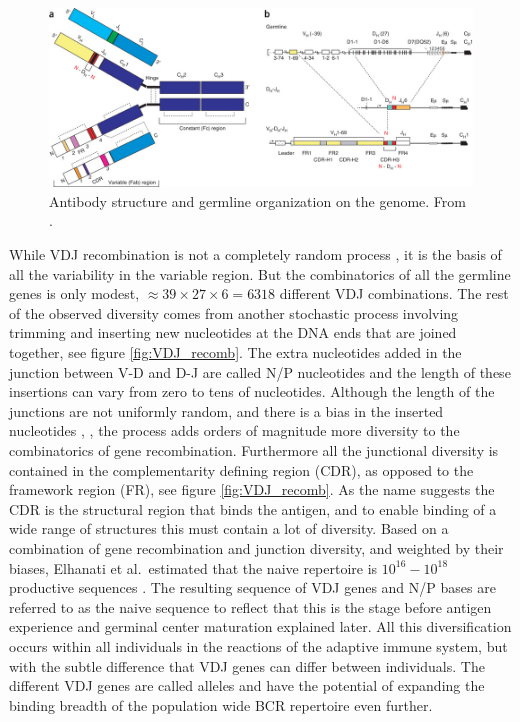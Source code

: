 \begin{figure}
    \centering
    \includegraphics[width=1\textwidth]{figures/ab_structure.jpg}
    \caption{
        \label{fig:BCR_structure2}
        Antibody structure and germline organization on the genome.
        From \cite{georgiou2014promise}.
    }
\end{figure}


While VDJ recombination is not a completely random process \cite{li2012recombinatorial}, it is the basis of all the variability in the variable region.
But the combinatorics of all the germline genes is only modest, $\approx 39\times27\times6=6318$ different VDJ combinations.
The rest of the observed diversity comes from another stochastic process involving trimming and inserting new nucleotides at the DNA ends that are joined together, see figure \ref{fig:VDJ_recomb}.
The extra nucleotides added in the junction between V-D and D-J are called N/P nucleotides and the length of these insertions can vary from zero to tens of nucleotides.
Although the length of the junctions are not uniformly random, and there is a bias in the inserted nucleotides \cite{murugan2012statistical}, \cite{elhanati2015inferring}, the process adds orders of magnitude more diversity to the combinatorics of gene recombination.
Furthermore all the junctional diversity is contained in the complementarity defining region (CDR), as opposed to the framework region (FR), see figure \ref{fig:VDJ_recomb}.
As the name suggests the CDR is the structural region that binds the antigen, and to enable binding of a wide range of structures this must contain a lot of diversity.
Based on a combination of gene recombination and junction diversity, and weighted by their biases, Elhanati et al.\ estimated that the naive repertoire is $10^{16} - 10^{18}$ productive sequences \cite{elhanati2015inferring}.
The resulting sequence of VDJ genes and N/P bases are referred to as the naive sequence to reflect that this is the stage before antigen experience and germinal center maturation explained later.
All this diversification occurs within all individuals in the reactions of the adaptive immune system, but with the subtle difference that VDJ genes can differ between individuals.
The different VDJ genes are called alleles and have the potential of expanding the binding breadth of the population wide BCR repertoire even further.


